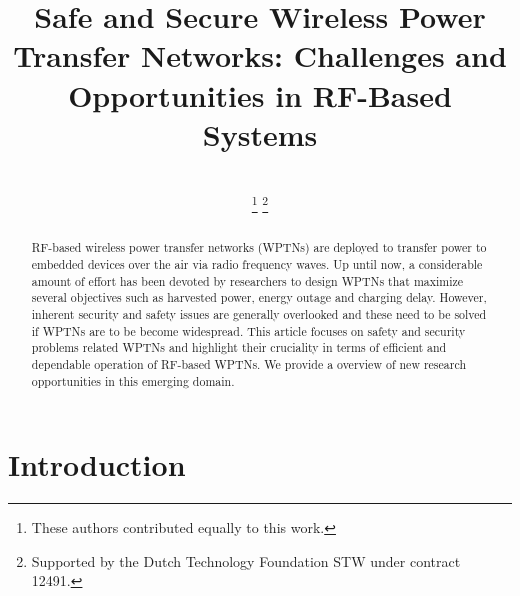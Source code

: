 \documentclass[journal,10pt,draftclsnofoot,onecolumn]{IEEEtran}
\begin{document}
\title{Safe and Secure Wireless Power Transfer Networks: Challenges and Opportunities in RF-Based Systems}

\author{
\\ 
\thanks{These authors contributed equally to this work.}
\thanks{Supported by the Dutch Technology Foundation STW under contract 12491.}
}

\maketitle

\begin{abstract}

RF-based wireless power transfer networks (WPTNs) are deployed to transfer power to embedded devices over the air via radio frequency waves. Up until now, a considerable amount of effort has been devoted by researchers to design WPTNs that maximize several objectives such as harvested power, energy outage and charging delay. However, inherent security and safety issues are generally overlooked and these need to be solved if WPTNs are to be become widespread. This article focuses on safety and security problems related WPTNs and highlight their cruciality in terms of efficient and dependable operation of RF-based WPTNs. We provide a overview of new research opportunities in this emerging domain.

\end{abstract}

\section{Introduction}
\label{sec:Intro}
\end{document}
